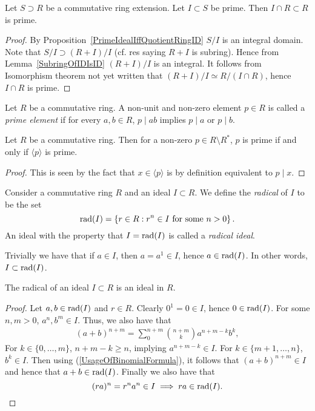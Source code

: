 \begin{proposition}\label{EliminationIdealOfPrimeIdealIsPrime}
    Let $S\supset R$ be a commutative ring extension. Let $I\subset S$ be prime. Then $I\cap R\subset R$ is prime.  
\end{proposition}
\begin{proof}
    By Proposition~\ref{PrimeIdealIffQuotientRingID} $S/I$ is an integral domain. Note that $S/I\supset (R+I)/I$ (cf. {\LARGE res saying $R+I$ is subring}). Hence from Lemma~\ref{SubringOfIDIsID} $(R+I)/I$ is an integral. It follows from {\LARGE Isomorphism theorem not yet written} that $(R+I)/I\simeq R/(I\cap R)$, hence $I\cap R$ is prime.
\end{proof}
\begin{definition}
    Let $R$ be a commutative ring. A non-unit and non-zero element $p \in R$ is called a \textit{prime element} if for every $a,b\in R$, $p\mid ab$ implies $p\mid a$ or $p\mid b$. 
\end{definition}
\begin{lemma}\label{PrimeElementsGeneratePrimeIdeals}
    Let $R$ be a commutative ring. Then for a non-zero $p\in R\setminus R^\ast$, $p$ is prime if and only if $\langle p \rangle$ is prime.
\end{lemma}
\begin{proof}
    This is seen by the fact that $x \in \langle p\rangle $ is by definition equivalent to $p\mid x$. 
\end{proof}
\begin{definition}
    Consider a commutative ring $R$ and an ideal $I \subset R$. We define the \textit{radical} of $I$ to be the set
    $$\mathrm{rad}(I)= \left\{ r\in R : r^n\in I \text{ for some } n>0 \right\}.$$
    An ideal with the property that $I = \mathrm{rad}(I)$ is called a \textit{radical ideal}. 
\end{definition}
\begin{remark}\label{IdealContainedInItsRadical}
    Trivially we have that if $a\in I$, then $a=a^1\in I$, hence $a\in \mathrm{rad}(I)$. In other words, $I\subset \mathrm{rad}(I)$.
\end{remark}
\begin{lemma}
    The radical of an ideal $I\subset R$ is an ideal in $R$.
\end{lemma}
\begin{proof}
    Let $a,b \in \mathrm{rad}(I)$ and $r\in R$. Clearly $0^1=0\in I$, hence $0\in \mathrm{rad}(I)$. For some $n,m>0$, $a^n,b^m\in I$. Thus, we also have that 
    \begin{align}\label{UsageOfBinomialFormula}
        (a+b)^{n+m} = \sum_{0}^{n+m} {n+m\choose k} a^{n+m-k}b^k,
    \end{align}
    For $k\in \{0,\dots,m\}$, $n+m-k\geq n$, implying $a^{n+m-k}\in I$. For $k\in \{m+1,\dots,n\}$, $b^k \in I$. Then using (\ref{UsageOfBinomialFormula}), it follows that $(a+b)^{n+m}\in I$ and hence that $a+b \in \mathrm{rad}(I)$. Finally we also have that 
    $$(ra)^n = r^na^n\in I \implies ra\in \mathrm{rad}(I).$$
\end{proof}
